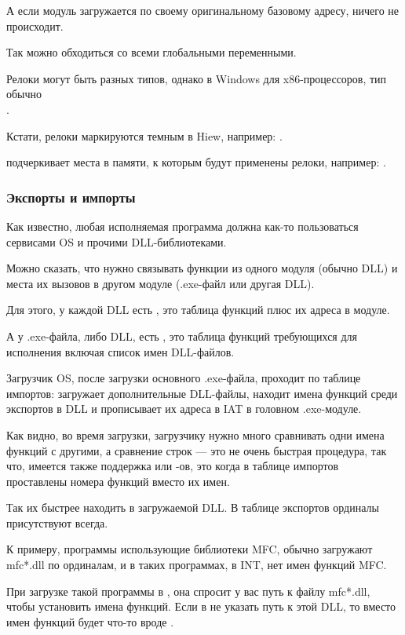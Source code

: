А если модуль загружается по своему оригинальному базовому адресу, ничего не происходит.

Так можно обходиться со всеми глобальными переменными.

Релоки могут быть разных типов, однако в Windows для x86-процессоров, тип обычно \\
.

Кстати, релоки маркируются темным в Hiew, например: .

\myindex{\olly}
\olly подчеркивает места в памяти, к которым будут применены релоки, например: .

\subsubsection{Экспорты и импорты}

\label{PE_exports_imports}
Как известно, любая исполняемая программа должна как-то пользоваться сервисами \ac{OS} и прочими DLL-библиотеками.

Можно сказать, что нужно связывать функции из одного модуля (обычно DLL) и места их вызовов в другом модуле (.exe-файл или другая DLL).

Для этого, у каждой DLL есть , это таблица функций плюс их адреса в модуле.

А у .exe-файла, либо DLL, есть , это таблица функций требующихся для исполнения
включая список имен DLL-файлов.

Загрузчик \ac{OS}, после загрузки основного .exe-файла, проходит по таблице импортов:
загружает дополнительные DLL-файлы, 
находит имена функций среди экспортов в DLL и прописывает их адреса в \ac{IAT} в головном .exe-модуле.

Как видно, во время загрузки, загрузчику нужно много сравнивать одни имена функций с другими,
а сравнение строк --- это не очень быстрая процедура, так что,
имеется также поддержка  или
-ов, это когда в таблице импортов проставлены номера функций вместо их имен.

Так их быстрее находить в загружаемой DLL.
В таблице экспортов ординалы присутствуют всегда.

К примеру, программы использующие библиотеки \ac{MFC}, обычно загружают mfc*.dll по ординалам, и в таких программах, в \ac{INT}, нет имен функций \ac{MFC}.

При загрузке такой программы в \IDA, она спросит у вас путь к файлу mfc*.dll,
чтобы установить имена функций.
Если в \IDA не указать путь к этой DLL, то вместо имен функций будет что-то вроде .

